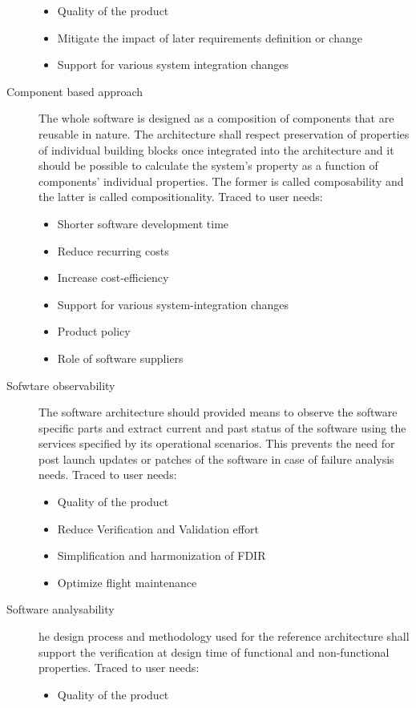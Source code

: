 \begin{description}
\begin{itemize}
\item Quality of the product
\item Mitigate the impact of later requirements definition or change 
\item Support for various system integration changes
\end{itemize}	  	
\item [Component based approach] The whole software is designed as a composition of components that are reusable in nature. The architecture shall respect preservation of properties of individual building blocks once integrated into the architecture and it should be possible to calculate the system's property as a function of components' individual properties. The former is called composability and the latter is called compositionality. Traced to user needs:
\begin{itemize}
\item Shorter software development time
\item Reduce recurring costs
\item Increase cost-efficiency
\item Support for various system-integration changes
\item Product policy
\item Role of software suppliers 
\end{itemize}  
\item [Sofwtare observability] The software architecture should provided means to observe the software specific parts and extract current and past status of the software using the services specified by its operational scenarios. This prevents the need for post launch updates or patches of the software in case of failure analysis needs. Traced to user needs:
\begin{itemize}
\item Quality of the product
\item Reduce Verification and Validation effort
\item Simplification and harmonization of FDIR
\item Optimize flight maintenance 
\end{itemize} 
\item [Software analysability] he design process and methodology used for the reference architecture shall support the verification at design time of functional and non-functional properties. Traced to user needs:
\begin{itemize}
\item Quality of the product

\end{itemize}
\end{description}

